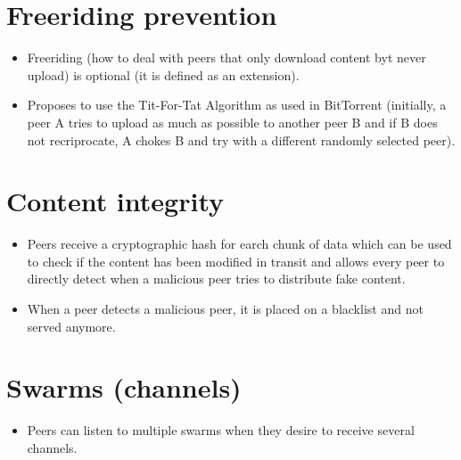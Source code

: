
\section{Freeriding prevention}

\begin{itemize}
\item Freeriding (how to deal with peers that only download content
  byt never upload) is optional (it is defined as an extension).
\item Proposes to use the Tit-For-Tat Algorithm as used in BitTorrent
  (initially, a peer A tries to upload as much as possible to another
  peer B and if B does not recriprocate, A chokes B and try with a
  different randomly selected peer).
\end{itemize}


\section{Content integrity}

\begin{itemize}
\item Peers receive a cryptographic hash for earch chunk of data which
  can be used to check if the content has been modified in transit and
  allows every peer to directly detect when a malicious peer tries to
  distribute fake content.
\item When a peer detects a malicious peer, it is placed on a
  blacklist and not served anymore.
\end{itemize}


\section{Swarms (channels)}

\begin{itemize}
\item Peers can listen to multiple swarms when they desire to receive
  several channels.
\end{itemize}


